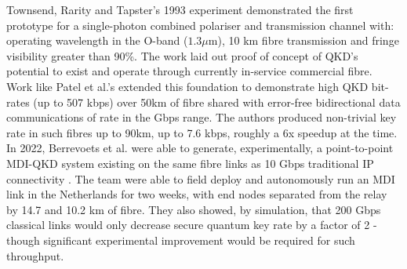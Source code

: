 \documentclass[9pt,technote]{IEEEtran}
\begin{document}
Townsend, Rarity and Tapster's 1993 experiment \cite{Townsend1993} demonstrated the first prototype for a single-photon combined polariser and transmission channel with: operating wavelength in the O-band ($1.3\mu\text{m}$), 10 km fibre transmission and fringe visibility greater than 90\%. The work laid out proof of concept of QKD's potential to exist and operate through currently in-service commercial fibre. Work like Patel et al.'s \cite{Patel_2012} extended this foundation to demonstrate high QKD bit-rates (up to 507 kbps) over 50km of fibre shared with error-free bidirectional data communications of rate in the Gbps range. The authors produced non-trivial key rate in such fibres up to 90km, up to 7.6 kbps, roughly a 6x speedup at the time. In 2022, Berrevoets et al. were able to generate, experimentally, a point-to-point MDI-QKD system existing on the same fibre links as 10 Gbps traditional IP connectivity \cite{Berrevoets_2022}. The team were able to field deploy and autonomously run an MDI link in the Netherlands for two weeks, with end nodes separated from the relay by 14.7 and 10.2 km of fibre. They also showed, by simulation, that 200 Gbps classical links would only decrease secure quantum key rate by a factor of 2 - though significant experimental improvement would be required for such throughput.
\end{document}
